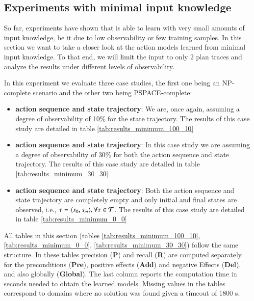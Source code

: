 \subsection{Experiments with minimal input knowledge}
\label{minimal}
So far, experiments have shown that \FAMA is able to learn with very small amounts of input knowledge, be it due to low observability or few training samples. In this section we want to take a closer look at the action models learned from minimal input knowledge. To that end, we will limit the input to only 2 plan traces and analyze the results under different levels of observability.

In this experiment we evaluate three case studies, the first one being an NP-complete scenario and the other two being PSPACE-complete:
\begin{itemize}
	\item \textbf{\FO action sequence and \PO state trajectory}: We are, once again, assuming a degree of observability of 10\% for the state trajectory. The results of this case study are detailed in table \ref{tab:results_minimum_100_10}
	\item  \textbf{\PO action sequence and \PO state trajectory}: In this case study we are assuming a degree of observability of 30\% for both the action sequence and state trajectory. The results of this case study are detailed in table \ref{tab:results_minimum_30_30}
	\item  \textbf{\NO action sequence and \NO state trajectory}: Both the action sequence and state trajectory are completely empty and only initial and final states are observed, i.e., $\tau = {\langle s_0, s_m \rangle}, \forall \tau \in \mathcal{T}$. The results of this case study are detailed in table \ref{tab:results_minimum_0_0}
\end{itemize}

All tables in this section (tables \ref{tab:results_minimum_100_10}, \ref{tab:results_minimum_0_0}, \ref{tab:results_minimum_30_30}) follow the same structure. In these tables precision ({\bf P}) and recall ({\bf R}) are computed separately for the preconditions ({\bf Pre}), positive effects ({\bf Add}) and negative Effects ({\bf Del}), and also globally ({\bf Global}). The last column reports the computation time in seconds needed to obtain the learned models. Missing values in the tables correspond to domains where no solution was found given a timeout of 1800 s.

